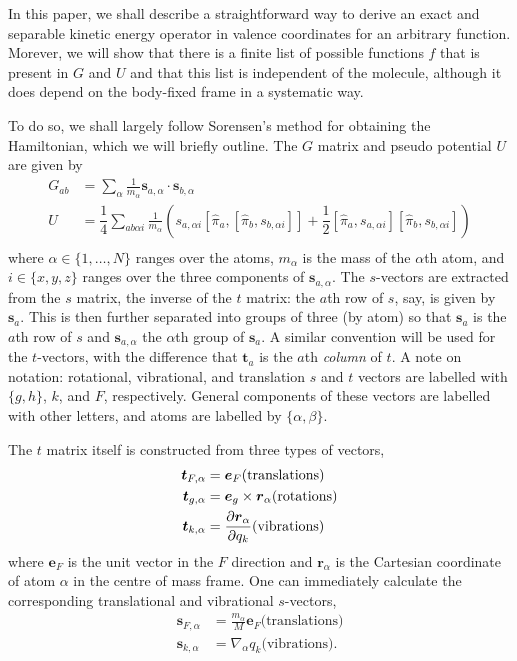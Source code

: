 \documentclass{article}
\newcommand{\vect}[1]{\boldsymbol{#1}}
\begin{document}
In this paper, we shall describe a straightforward way to derive an exact and separable kinetic energy operator in valence coordinates for an arbitrary function. Morever, we will show that there is a finite list of possible functions $f$ that is present in $G$ and $U$ and that this list is independent of the molecule, although it does depend on the body-fixed frame in a systematic way.   

To do so, we shall largely follow Sorensen's method for obtaining the Hamiltonian, which we will briefly outline. The $G$ matrix and pseudo potential $U$ are given by
\[
\begin{split}
G_{ab} &= \sum_{\alpha} \frac{1}{m_\alpha}\vect{s}_{a, \alpha}\cdot \vect{s}_{b, \alpha} \\
U &= \dfrac14 \sum_{ab \alpha i} \frac{1}{m_\alpha}(s_{a,\alpha i}[\hat{\pi}_a,[\hat{\pi}_b, s_{b,\alpha i}]] + \dfrac12 [\hat{\pi}_a, s_{a,\alpha i}][\hat{\pi}_b, s_{b,\alpha i}]) \\
\end{split}
\]
where $\alpha \in \{ 1, \ldots, N \}$ ranges over the atoms, $m_{\alpha}$ is the mass of the $\alpha$th atom, and $i \in \{ x,y,z\}$ ranges over the three components of $\vect{s}_{a,\alpha}$. The $s$-vectors are extracted from the $s$ matrix, the inverse of the $t$ matrix: the $a$th row of $s$, say, is given by $\vect{s}_{a}$. This is then further separated into groups of three (by atom) so that $\vect{s}_{a}$ is the $a$th row of $s$ and $\vect{s}_{a, \alpha}$ the $\alpha$th group of $\vect{s}_a$. A similar convention will be used for the $t$-vectors, with the difference that $\vect{t}_a$ is the $a$th \emph{column} of $t$. A note on notation: rotational, vibrational, and translation $s$ and $t$ vectors are labelled with $\{g, h\}$, $k$, and $F$, respectively. General components of these vectors are labelled with other letters, and atoms are labelled by $\{\alpha, \beta\}$.  

The $t$ matrix itself is constructed from three types of vectors,
\[
\begin{split}
    \vect{t}_{F,\alpha} &= \vect{e}_F  \text{(translations)} \\
    \vect{t}_{g, \alpha} &= \vect{e}_g \times \vect{r}_\alpha \text{(rotations)} \\
    \vect{t}_{k,\alpha} &= \pdv{\vect{r}_\alpha}{q_k} \text{(vibrations)} 
\end{split}
\]
where $\vect{e}_F$ is the unit vector in the $F$ direction and $\vect{r}_\alpha$ is the Cartesian coordinate of atom $\alpha$ in the centre of mass frame. One can immediately calculate the corresponding translational and vibrational $s$-vectors,
\[
\begin{split}
    \vect{s}_{F,\alpha} &= \frac{m_\alpha}{M}\vect{e}_F \text{(translations)} \\
    \vect{s}_{k, \alpha} &= \nabla_\alpha q_k \text{(vibrations).} \\
\end{split}
\]
\end{document}
